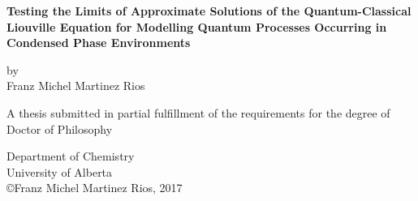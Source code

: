 \begin{titlepage}
    \begin{center}
        \vspace*{1cm}
        
        \Large{\textbf{Testing the Limits of Approximate Solutions of the Quantum-Classical Liouville Equation for Modelling Quantum Processes Occurring in Condensed Phase Environments}}
        
        
        \vspace{2cm}
        \normalsize
        by \\ Franz Michel Martinez Rios
        \vfill
        
        A thesis submitted in partial fulfillment of the requirements for the degree of \\
        Doctor of Philosophy
        
        \vspace{0.8cm}
        
        Department of Chemistry\\
        University of Alberta\\
     \hfill\break
        \copyright Franz Michel Martinez Rios, 2017
        
    \end{center}
\end{titlepage}
